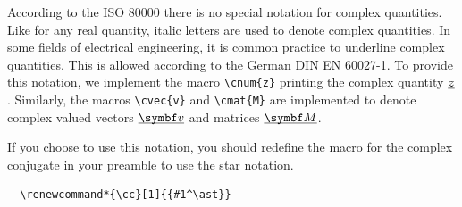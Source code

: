 \documentclass[DIV=13]{scrartcl}
\begin{document}
According to the ISO \num{80000} there is no special notation for complex
quantities. Like for any real quantity, italic letters are used to denote
complex quantities. In some fields of electrical engineering, it is common
practice to underline complex quantities. This is allowed according to the
German DIN EN \num{60027}-1. To provide this notation, we implement the
macro \verb|\cnum{z}| printing the complex quantity $\underline{\smash{z}}$. Similarly,
the macros \verb|\cvec{v}| and \verb|\cmat{M}| are implemented to denote
complex valued vectors $\cvec{v}$ and matrices $\cmat{M}$.

If you choose to use this notation, you should redefine the macro for the
complex conjugate in your preamble to use the star notation.
\begin{verbatim}
  \renewcommand*{\cc}[1]{{#1^\ast}}
\end{verbatim}
\end{document}
